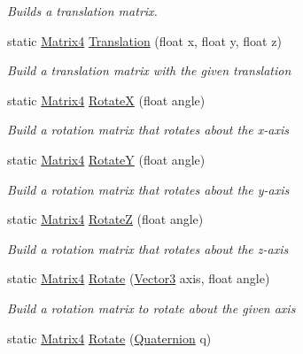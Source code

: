 \begin{DoxyCompactItemize}
\begin{DoxyCompactList}\small\item\em Builds a translation matrix. \end{DoxyCompactList}\item 
static \hyperlink{struct_open_t_k_1_1_matrix4}{Matrix4} \hyperlink{struct_open_t_k_1_1_matrix4_a2145c45977b80c99311be5c6b19750d0}{Translation} (float x, float y, float z)
\begin{DoxyCompactList}\small\item\em Build a translation matrix with the given translation \end{DoxyCompactList}\item 
static \hyperlink{struct_open_t_k_1_1_matrix4}{Matrix4} \hyperlink{struct_open_t_k_1_1_matrix4_ac5bf042c260d6b0e2abdfe212e65c6af}{Rotate\-X} (float angle)
\begin{DoxyCompactList}\small\item\em Build a rotation matrix that rotates about the x-\/axis \end{DoxyCompactList}\item 
static \hyperlink{struct_open_t_k_1_1_matrix4}{Matrix4} \hyperlink{struct_open_t_k_1_1_matrix4_ac20cab216c2115975c17bb5a3940bdb9}{Rotate\-Y} (float angle)
\begin{DoxyCompactList}\small\item\em Build a rotation matrix that rotates about the y-\/axis \end{DoxyCompactList}\item 
static \hyperlink{struct_open_t_k_1_1_matrix4}{Matrix4} \hyperlink{struct_open_t_k_1_1_matrix4_ae9868e1bd3b8aa411abd848e107a55af}{Rotate\-Z} (float angle)
\begin{DoxyCompactList}\small\item\em Build a rotation matrix that rotates about the z-\/axis \end{DoxyCompactList}\item 
static \hyperlink{struct_open_t_k_1_1_matrix4}{Matrix4} \hyperlink{struct_open_t_k_1_1_matrix4_a78fe44e18bbd3ba4abf372ef128c3dda}{Rotate} (\hyperlink{struct_open_t_k_1_1_vector3}{Vector3} axis, float angle)
\begin{DoxyCompactList}\small\item\em Build a rotation matrix to rotate about the given axis \end{DoxyCompactList}\item 
static \hyperlink{struct_open_t_k_1_1_matrix4}{Matrix4} \hyperlink{struct_open_t_k_1_1_matrix4_ab3f3d04d37bf34516f2ace0ea8af7f47}{Rotate} (\hyperlink{struct_open_t_k_1_1_quaternion}{Quaternion} q)

\end{DoxyCompactItemize}
